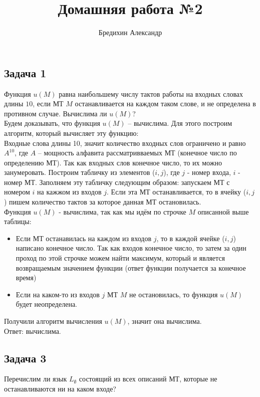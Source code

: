 \documentclass[a4paper,12pt]{article} %
\author{Бредихин Александр}
\title{Домашняя работа №2}
\begin{document}

\maketitle

\subsection*{Задача 1}
Функция $u(M)$ равна наибольшему числу тактов работы на входных словах длины $10$, если МТ $M$ останавливается на каждом таком слове, и не определена в противном случае. Вычислима ли $u(M)$?\\

Будем доказывать, что функция $u(M)$ -- вычислима. Для этого построим алгоритм, который вычисляет эту функцию:\\
Входные слова длины 10, значит количество входных слов ограничено и равно $ A^{10} $, где $ A $ -- мощность алфавита рассматривваемых МТ (конечное число по определению МТ). Так как входных слов конечное число, то их можно занумеровать. Построим табличку из элементов ($ i , j$), где $j$ - номер входа, $ i $ - номер МТ. Заполняем эту табличку следующим образом: запускаем МТ с номером $i$ на кажжом из входов $j$. Если эта МТ останавливается, то в ячейку ($ i , j$) пишем количество тактов за которое данная МТ остановилась.\\
Функция $u(M)$ - вычислима, так как мы идём по строчке $ M $ описанной выше таблицы:
\begin{itemize}
\item Если МТ останавилась на каждом из входов $ j $, то в каждой ячейке ($ i , j$) написано конечное число. Так как входов конечное число, то затем за один проход по этой строчке можем найти максимум, который и является возвращаемым значением функции (ответ функции получается за конечное время)
\item Если на каком-то из входов $ j $ МТ $ M $ не остановилась, то функция $u(M)$ будет неопределена.
\end{itemize}
Получили алгоритм вычисления $u(M)$, значит она вычислима.\\
Ответ: вычислима.

\subsection*{Задача 3}
Перечислим ли язык $L_\emptyset$ состоящий из всех описаний МТ, которые не останавливаются ни на каком входе? \\
\end{document}
